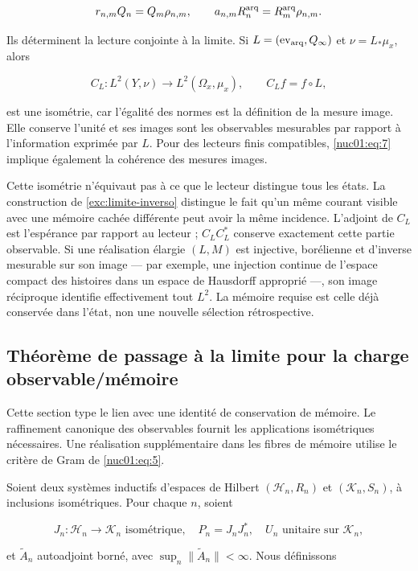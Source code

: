 \begin{equation}
r_{n,m}Q_n=Q_m\rho_{n,m},\qquad
a_{n,m}R^{\rm arq}_n=R^{\rm arq}_m\rho_{n,m}.
\label{nuc01:eq:7}
\end{equation}

Ils déterminent la lecture conjointe à la limite. Si \(L=(\operatorname{ev}_{\rm arq},Q_\infty)\) et \(\nu=L_*\mu_x\), alors

\[
C_L:L^2(Y,\nu)\longrightarrow L^2(\Omega_x,\mu_x),
\qquad C_Lf=f\circ L,
\]

est une isométrie, car l’égalité des normes est la définition de la mesure image. Elle conserve l’unité et ses images sont les observables mesurables par rapport à l’information exprimée par \(L\). Pour des lecteurs finis compatibles, \eqref{nuc01:eq:7} implique également la cohérence des mesures images.

Cette isométrie n’équivaut pas à ce que le lecteur distingue tous les états. La construction de \cref{exc:limite-inverso} distingue le fait qu’un même courant visible avec une mémoire cachée différente peut avoir la même incidence. L’adjoint de \(C_L\) est l’espérance par rapport au lecteur ; \(C_LC_L^*\) conserve exactement cette partie observable. Si une réalisation élargie \((L,M)\) est injective, borélienne et d’inverse mesurable sur son image — par exemple, une injection continue de l’espace compact des histoires dans un espace de Hausdorff approprié —, son image réciproque identifie effectivement tout \(L^2\). La mémoire requise est celle déjà conservée dans l’état, non une nouvelle sélection rétrospective.


\subsection{Théorème de passage à la limite pour la charge observable/mémoire}

Cette section type le lien avec une identité de conservation de mémoire. Le raffinement canonique des observables fournit les applications isométriques nécessaires. Une réalisation supplémentaire dans les fibres de mémoire utilise le critère de Gram de \eqref{nuc01:eq:5}.

Soient deux systèmes inductifs d’espaces de Hilbert \((\mathscr H_n,R_n)\) et \((\mathscr K_n,S_n)\), à inclusions isométriques. Pour chaque \(n\), soient

\[
J_n:\mathscr H_n\to\mathscr K_n\text{ isométrique},\quad
P_n=J_nJ_n^*,\quad U_n\text{ unitaire sur }\mathscr K_n,
\]

et \(\widetilde A_n\) autoadjoint borné, avec \(\sup_n\|\widetilde A_n\|<\infty\). Nous définissons

